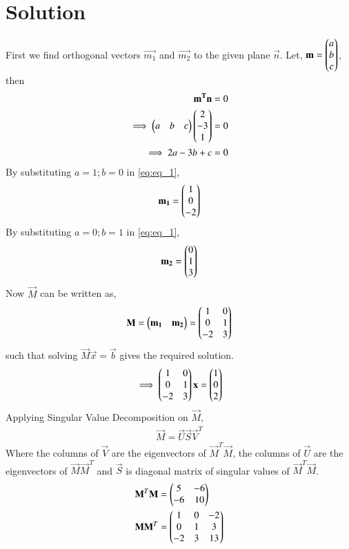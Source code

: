 \documentclass[journal,12pt,twocolumn]{IEEEtran}
\begin{document}
\section{Solution}
First we find orthogonal vectors $\vec{m_1}$ and $\vec{m_2}$ to the given plane $\vec{n}$. Let, $\mathbf{m} = \begin{pmatrix}a\\b\\c\end{pmatrix}$, then
\begin{align}
\mathbf{m^T}\mathbf{n} &= 0 \nonumber \\
\implies \begin{pmatrix}a & b & c\end{pmatrix} \begin{pmatrix}2 \\ -3 \\ 1\end{pmatrix} &= 0 \nonumber \\
\implies 2a-3b+c &= 0 \label{eq:eq_1}
\end{align}
By substituting $a=1;b=0$ in \eqref{eq:eq_1},
\begin{align} \label{eq:eq_2}
    \mathbf{m_1} = \begin{pmatrix}1 \\ 0 \\ -2\end{pmatrix} 
\end{align}
By substituting $a=0;b=1$ in \eqref{eq:eq_1},
\begin{align} \label{eq:eq_3}
    \mathbf{m_2} = \begin{pmatrix}0 \\ 1 \\ 3\end{pmatrix} 
\end{align}
Now $\vec{M}$ can be written as,
\begin{align} \label{eq:eq_4}
    \mathbf{M} = \begin{pmatrix}\mathbf{m_1} & \mathbf{m_2}\end{pmatrix} = \begin{pmatrix}1 & 0 \\ 0 & 1 \\ -2 & 3\end{pmatrix}
\end{align}
such that solving $\vec{M}\vec{x}=\vec{b}$ gives the required solution. 
\begin{align} \label{eq:eq_5}
    \implies \begin{pmatrix}1 & 0 \\ 0 & 1 \\ -2 & 3\end{pmatrix}\mathbf{x} = \begin{pmatrix}1 \\ 0 \\ 2\end{pmatrix}
\end{align}
Applying Singular Value Decomposition on $\vec{M}$,
\begin{align} \label{eq:eq_6}
    \vec{M}=\vec{U}\vec{S}\vec{V}^T
\end{align}
Where the columns of $\vec{V}$ are the eigenvectors of $\vec{M}^T\vec{M}$, the columns of $\vec{U}$ are the eigenvectors of $\vec{M}\vec{M}^T$ and $\vec{S}$ is diagonal matrix of singular values of $\vec{M}^T\vec{M}$.
\begin{align}
    \mathbf{M}^T \mathbf{M} &= \begin{pmatrix}5 & -6 \\ -6 & 10\end{pmatrix}\label{eq:eq_7} \\
    \mathbf{M} \mathbf{M}^T &= \begin{pmatrix}1 & 0 & -2\\ 0 & 1 & 3 \\ -2 & 3 & 13\end{pmatrix} \label{eq:eq_8}
\end{align}
\end{document}
